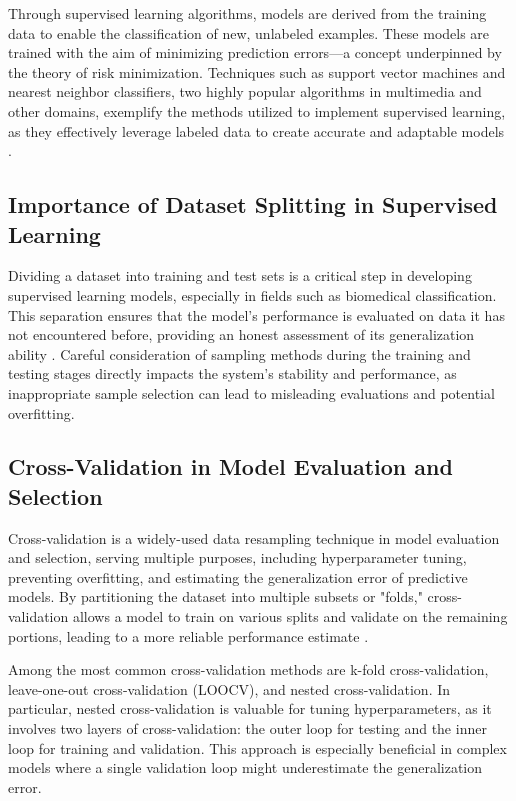 \documentclass{article}
\begin{document}
Through supervised learning algorithms, models are derived from the training data to enable the classification of new, unlabeled examples. These models are trained with the aim of minimizing prediction errors—a concept underpinned by the theory of risk minimization. Techniques such as support vector machines and nearest neighbor classifiers, two highly popular algorithms in multimedia and other domains, exemplify the methods utilized to implement supervised learning, as they effectively leverage labeled data to create accurate and adaptable models \cite{Cunningham2008}.\\

\subsection{Importance of Dataset Splitting in Supervised Learning}

Dividing a dataset into training and test sets is a critical step in developing supervised learning models, especially in fields such as biomedical classification. This separation ensures that the model's performance is evaluated on data it has not encountered before, providing an honest assessment of its generalization ability \cite{https://doi.org/10.1155/2020/2836236}. Careful consideration of sampling methods during the training and testing stages directly impacts the system's stability and performance, as inappropriate sample selection can lead to misleading evaluations and potential overfitting.


\subsection{Cross-Validation in Model Evaluation and Selection}

Cross-validation is a widely-used data resampling technique in model evaluation and selection, serving multiple purposes, including hyperparameter tuning, preventing overfitting, and estimating the generalization error of predictive models. By partitioning the dataset into multiple subsets or "folds," cross-validation allows a model to train on various splits and validate on the remaining portions, leading to a more reliable performance estimate \cite{berrar2019cross}.

Among the most common cross-validation methods are k-fold cross-validation, leave-one-out cross-validation (LOOCV), and nested cross-validation. In particular, nested cross-validation is valuable for tuning hyperparameters, as it involves two layers of cross-validation: the outer loop for testing and the inner loop for training and validation. This approach is especially beneficial in complex models where a single validation loop might underestimate the generalization error.
\end{document}
